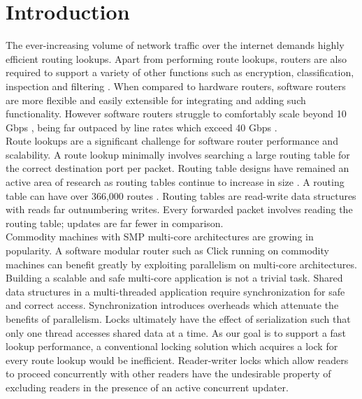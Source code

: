\documentclass[a4paper]{article}
\begin{document}




\tableofcontents

\pagebreak
\section{Introduction}
The ever-increasing volume of network traffic over the internet demands highly efficient routing lookups. Apart from performing route lookups, routers are also required to support a variety of other functions such as encryption, classification, inspection and filtering \cite{routebricks}. When compared to hardware routers, software routers are more flexible and easily extensible for integrating and adding such functionality. However software routers struggle to comfortably scale beyond 10 Gbps \cite{routebricks}, being far outpaced by line rates which exceed 40 Gbps \cite{attlinkrate}.\\

Route lookups are a significant challenge for software router performance and scalability. A route lookup minimally involves searching a large routing table for the correct destination port per packet. Routing table designs have remained an active area of research \cite{fastrtable1,fastrtable2,fastrtable3} as routing tables continue to increase in size \cite{incrtablesize}. A routing table can have over 366,000 routes \cite{routeviews}. Routing tables are read-write data structures with reads far outnumbering writes. Every forwarded packet involves reading the routing table; updates are far fewer in comparison. \\

Commodity machines with SMP multi-core architectures are growing in popularity. A software modular router such as Click \cite{click} running on commodity machines  can benefit greatly by exploiting parallelism on multi-core architectures. Building a scalable and safe multi-core application is not a trivial task. Shared data structures in a multi-threaded application require synchronization for safe and correct access. Synchronization introduces overheads which attenuate the benefits of parallelism. Locks ultimately have the effect of  serialization such that only one thread accesses shared data at a time. As our goal is to support a fast lookup performance, a conventional locking solution which acquires a lock for every route lookup would be inefficient. Reader-writer locks which allow readers to proceed concurrently with other readers have the undesirable property of excluding readers in the presence of an active concurrent updater.\\
\end{document}
